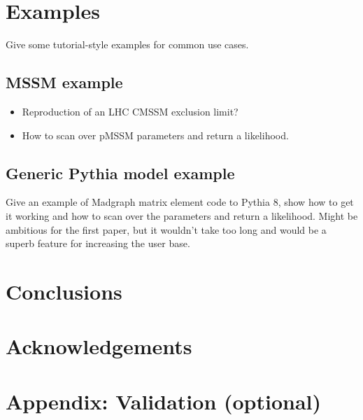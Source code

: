 \documentclass[11pt,a4paper]{article}
\begin{document}
\section{Examples}

Give some tutorial-style examples for common use cases.

\subsection{MSSM example}

\begin{itemize}
\item Reproduction of an LHC CMSSM exclusion limit?
\item How to scan over pMSSM parameters and return a likelihood.

\end{itemize}

\subsection{Generic Pythia model example}

Give an example of Madgraph matrix element code to Pythia 8, show how to get it working and how to scan over the parameters and return a likelihood. Might be ambitious for the first paper, but it wouldn't take too long and would be a superb feature for increasing the user base.

\section{Conclusions}

\section{Acknowledgements}

\section{Appendix: Validation (optional)}
\end{document}
